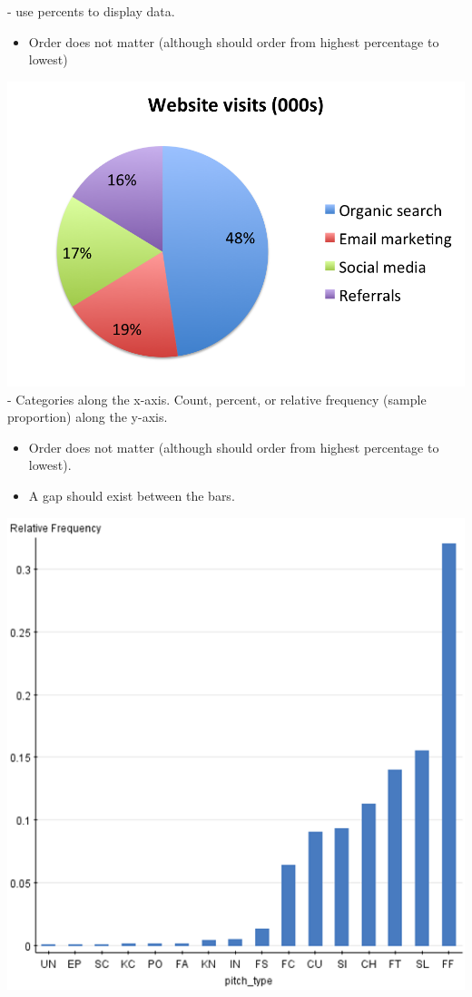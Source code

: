 \underbar{~~~~~~~~~~~~~~~~~~~~~~~~~~~~~~~~~~~~}  - use percents to display data. 
\begin{itemize}
\item Order does not matter (although should order from highest percentage to lowest)
\end{itemize}
\includegraphics[scale=0.5]{piechart}\\
\underbar{~~~~~~~~~~~~~~~~~~~~~~~~~~~~~~~~~~~~}  - Categories along the x-axis.  Count, percent, or relative frequency (sample proportion) along the y-axis.  
\begin{itemize}
\item Order does not matter (although should order from highest percentage to lowest).  
\item A gap should exist between the bars.
\end{itemize}
\includegraphics[scale=0.5]{bargraph}

